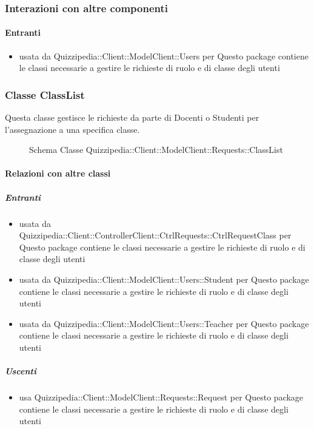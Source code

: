 \subsubsection{Interazioni con altre componenti}
\paragraph{Entranti}
\begin{itemize}
\item usata da Quizzipedia::Client::ModelClient::Users per Questo package contiene le classi necessarie a gestire le richieste di ruolo e di classe degli utenti
\end{itemize}
\subsubsection{Classe ClassList}
Questa classe gestisce le richieste da parte di Docenti o Studenti per l'assegnazione a una specifica classe.
\begin{figure}[H]
\centering
\noindent{}
\caption[Schema Classe ClassList]{Schema Classe Quizzipedia::Client::ModelClient::Requests::ClassList}
\end{figure}
\paragraph{Relazioni con altre classi}
\subparagraph{Entranti}
\begin{itemize}
\item usata da Quizzipedia::Client::ControllerClient::CtrlRequests::CtrlRequestClass per Questo package contiene le classi necessarie a gestire le richieste di ruolo e di classe degli utenti
\item usata da Quizzipedia::Client::ModelClient::Users::Student per Questo package contiene le classi necessarie a gestire le richieste di ruolo e di classe degli utenti
\item usata da Quizzipedia::Client::ModelClient::Users::Teacher per Questo package contiene le classi necessarie a gestire le richieste di ruolo e di classe degli utenti
\end{itemize}
\subparagraph{Uscenti}
\begin{itemize}
\item usa Quizzipedia::Client::ModelClient::Requests::Request per Questo package contiene le classi necessarie a gestire le richieste di ruolo e di classe degli utenti
\end{itemize}
